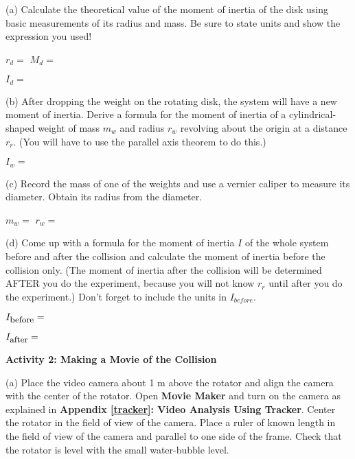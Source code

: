 (a) Calculate the theoretical value of the moment of inertia of the disk
using basic measurements of its radius and mass. Be sure to state units and
show the expression you used!
\vspace{5mm}

\( r_{d} =\)  \hfill{}\( M_{d}= \) \hfill{}
\vspace{5mm}

\( I_{d}= \)
\vspace{5mm}

(b) After dropping the weight on the rotating disk, the system will have a new
moment of inertia. Derive a formula for the moment of inertia of a cylindrical-shaped weight of mass \( m_{w} \) and radius \( r_{w} \) revolving about the origin at a distance \( r_{r} \). (You will have to use the parallel axis theorem to do this.)
\vspace{5mm}

\( I_{w} =\)  
\vspace{10mm}

(c) Record the mass of one of the weights and use a vernier caliper to measure its diameter. Obtain its radius from the diameter.
\vspace{5mm}

\( m_{w} =\)  \hfill{}\(r_{w} =\) \hfill{}
\vspace{5mm}

\pagebreak[2]
(d) Come up with a formula for the moment of inertia $I$ of the whole system
before and after the collision and calculate the moment of inertia before the
collision only. (The moment of inertia after the collision will be determined AFTER you do the experiment, because you will not know \( r_{r} \) until after you do the experiment.) Don't forget to include the units in \( I_{before} \).
\vspace{5mm}

\( I_{\mbox{\small before}}= \) 
\vspace{5mm}

\( I_{\mbox{\small after}} =\)  
\vspace{5mm}

\textbf{Activity 2: Making a Movie of the Collision} 

(a) Place the video camera about 1 m above the rotator and align the camera with
the center of the rotator. Open \textbf{Movie Maker} and turn on the camera as explained 
in \textbf{Appendix \ref{tracker}: Video Analysis Using Tracker}.  Center the rotator in the
field of view of the camera. Place a ruler of known length in the field of view of the camera and parallel to one side of the frame. Check that the rotator is level with the small water-bubble level.

